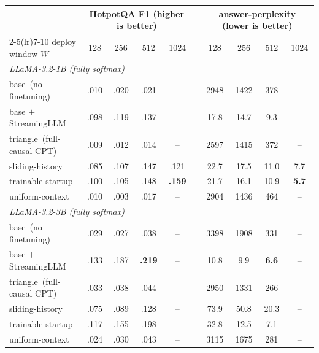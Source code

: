 \begin{table}[t]
\centering
\footnotesize
\setlength{\tabcolsep}{5pt}
\begin{tabular}{l cccc c cccc}
\toprule
& \multicolumn{4}{c}{\textbf{HotpotQA F1} (higher is better)} && \multicolumn{4}{c}{\textbf{answer-perplexity} (lower is better)} \\
\cmidrule(lr){2-5}\cmidrule(lr){7-10}
deploy window $W$ & 128 & 256 & 512 & 1024 && 128 & 256 & 512 & 1024 \\
\midrule
\multicolumn{10}{l}{\emph{LLaMA-3.2-1B (fully softmax)}}\\
base \,(no finetuning)        & .010 & .020 & .021 & --   && 2948 & 1422 & 378  & --   \\
base $+$ StreamingLLM         & .098 & .119 & .137 & --   && 17.8 & 14.7 & 9.3  & --   \\
triangle \,(full-causal CPT)  & .009 & .012 & .014 & --   && 2597 & 1415 & 372  & --   \\
sliding-history               & .085 & .107 & .147 & .121 && 22.7 & 17.5 & 11.0 & 7.7  \\
trainable-startup             & .100 & .105 & .148 & \textbf{.159} && 21.7 & 16.1 & 10.9 & \textbf{5.7} \\
uniform-context               & .010 & .003 & .017 & --   && 2904 & 1436 & 464  & --   \\
\multicolumn{10}{l}{\emph{LLaMA-3.2-3B (fully softmax)}}\\
base \,(no finetuning)        & .029 & .027 & .038 & --   && 3398 & 1908 & 331  & --   \\
base $+$ StreamingLLM         & .133 & .187 & \textbf{.219} & -- && 10.8 & 9.9 & \textbf{6.6} & -- \\
triangle \,(full-causal CPT)  & .033 & .038 & .044 & --   && 2950 & 1331 & 266  & --   \\
sliding-history               & .075 & .089 & .128 & --   && 73.9 & 50.8 & 20.3 & --   \\
trainable-startup             & .117 & .155 & .198 & --   && 32.8 & 12.5 & 7.1  & --   \\
uniform-context               & .024 & .030 & .043 & --   && 3115 & 1675 & 281  & --   \\
\bottomrule
\end{tabular}

\end{table}
